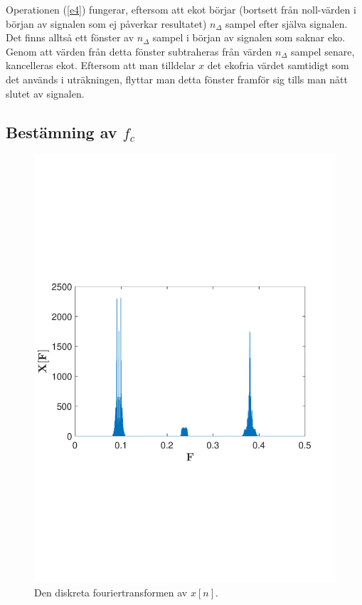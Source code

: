 \documentclass[10pt,twocolumn,a4paper]{article}
\begin{document}
Operationen (\ref{e4}) fungerar, eftersom att ekot börjar (bortsett från
noll-värden i början av signalen som ej påverkar resultatet) $n_\Delta$
sampel efter själva signalen. Det finns alltså ett fönster av $n_\Delta$
sampel i början av signalen som saknar eko. Genom att värden från detta fönster
subtraheras från värden $n_\Delta$ sampel senare, kancelleras ekot. Eftersom
att man tilldelar $x$ det ekofria värdet samtidigt som det används
i uträkningen, flyttar man detta fönster framför sig tills man nått slutet av
signalen.

\subsection{Bestämning av $f_c$}
\begin{figure}[width=\textwidth]

    \includegraphics[trim = 0 80mm 0 90mm, clip, width=\linewidth]{fig2.pdf}
    \caption{
        Den diskreta fouriertransformen av $x[n]$. 
        \label{fig:X}
    }
\end{figure}
\end{document}
